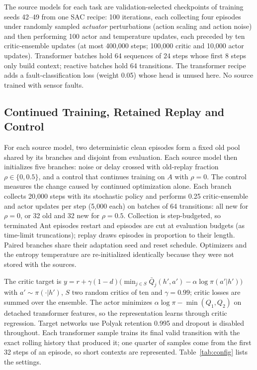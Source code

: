 \documentclass[runningheads]{llncs}
\begin{document}
The source models for each task are validation-selected checkpoints of training seeds 42--49 from one SAC recipe: 100 iterations, each collecting four episodes under randomly sampled \emph{actuator} perturbations (action scaling and action noise) and then performing 100 actor and temperature updates, each preceded by ten critic-ensemble updates (at most 400,000 steps; 100,000 critic and 10,000 actor updates). Transformer batches hold 64 sequences of 24 steps whose first 8 steps only build context; reactive batches hold 64 transitions. The transformer recipe adds a fault-classification loss (weight 0.05) whose head is unused here. No source trained with sensor faults.

\subsection{Continued Training, Retained Replay and Control}
For each source model, two deterministic clean episodes form a fixed old pool shared by its branches and disjoint from evaluation. Each source model then initializes five branches: noise or delay crossed with old-replay fraction $\rho\in\{0,0.5\}$, and a control that continues training on $A$ with $\rho=0$. The control measures the change caused by continued optimization alone. Each branch collects 20,000 steps with its stochastic policy and performs 0.25 critic-ensemble and actor updates per step (5,000 each) on batches of 64 transitions: all new for $\rho=0$, or 32 old and 32 new for $\rho=0.5$. Collection is step-budgeted, so terminated Ant episodes restart and episodes are cut at evaluation budgets (as time-limit truncations); replay draws episodes in proportion to their length. Paired branches share their adaptation seed and reset schedule. Optimizers and the entropy temperature are re-initialized identically because they were not stored with the sources.

The critic target is $y=r+\gamma(1-d)\big(\min_{j\in S}\bar Q_j(h',a')-\alpha\log\pi(a'|h')\big)$ with $a'\sim\pi(\cdot|h')$, $S$ two random critics of ten and $\gamma=0.99$; critic losses are summed over the ensemble. The actor minimizes $\alpha\log\pi-\min(Q_1,Q_2)$ on detached transformer features, so the representation learns through critic regression. Target networks use Polyak retention 0.995 and dropout is disabled throughout. Each transformer sample trains its final valid transition with the exact rolling history that produced it; one quarter of samples come from the first 32 steps of an episode, so short contexts are represented. Table~\ref{tab:config} lists the settings.
\end{document}
